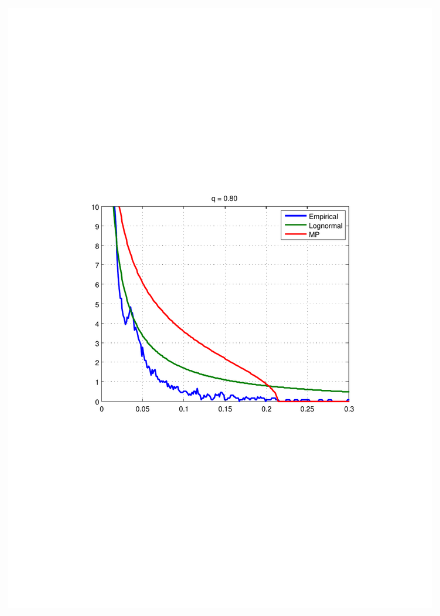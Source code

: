 \documentclass{article}
\begin{document}
\begin{figure}[htb!]
{    \includegraphics[scale=0.4, clip=true, trim=115 271 109
    204]{../pics/spectral_density_q0dot8.pdf}
  }
  \subfigure[q = 0.95, KL=0.15]{
}
\end{figure}
\end{document}
